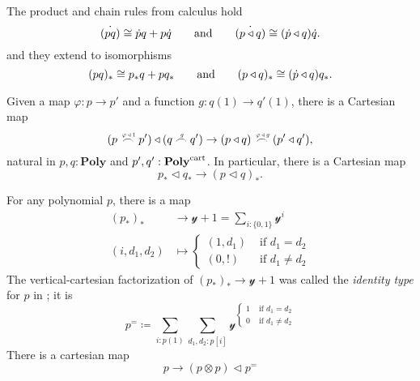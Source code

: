 \documentclass[11pt, one side, article]{memoir}
\theoremstyle{definition}
\theoremstyle{plain}
\newcommand{\Cat}[1]{\mathbf{#1}}%
\newcommand{\tn}[1]{\textnormal{#1}}
\newcommand{\yon}{{\mathcal{y}}}
\newcommand{\poly}{\Cat{Poly}}
\newcommand{\polycart}{\poly^{\tn{cart}}}
\newcommand{\0}{\textsf{0}}
\newcommand{\1}{\tn{\textsf{1}}}
\newcommand{\tri}{\mathbin{\triangleleft}}
\newcommand{\indexcoclscale}[1]{\scalebox{.7}{#1}}
\newcommand{\cocl}[1]{
	\scriptsize\overset{\,\indexcoclscale{$#1$}}{\frown}\normalsize
}
\newcommand{\hh}[2][]{#1 \tn{#2} #1}
\newcommand{\qqand}{\hh[\qquad]{and}}
\begin{document}
The product and chain rules from calculus hold
\begin{equation}\label{eqn.calculus}
	\dot{(pq)}\cong \dot{p}q+p\dot{q}
	\qqand
	\dot{(p\tri q)}\cong(\dot{p}\tri q)\dot{q}.
\end{equation}
and they extend to isomorphisms 
\begin{equation}\label{eqn.calculus}
	(pq)_*\cong p_*q+pq_*
	\qqand
	(p\tri q)_*\cong(\dot{p}\tri q)q_*.
\end{equation}

Given a map $\varphi\colon p\to p'$ and a function $g\colon q(1)\to q'(1)$, there is a Cartesian map
\begin{equation}
	(p\cocl{\varphi\tri1}p')\tri(q\cocl{g}q')\to
	(p\tri q)\cocl{\varphi\tri g}(p'\tri q'),
\end{equation}
natural in $p,q:\poly$ and $p',q':\polycart$. In particular, there is a Cartesian map
\begin{equation}
	p_*\tri q_*\to(p\tri q)_*.
\end{equation}


For any polynomial $p$, there is a map
\begin{align}
	(p_*)_*&\to\yon+1=\sum_{i:\{0,1\}}\yon^i\\
	(i,d_1,d_2)&\mapsto
	\begin{cases}
		(1,d_1)&\text{ if } d_1=d_2 \\
		(0,!)&\text{ if }d_1\neq d_2
	\end{cases}
\end{align}
The vertical-cartesian factorization of $(p_*)_*\to\yon+1$ was called the \emph{identity type} for $p$ in \cite{aberle2024polynomial}; it is
\begin{equation}
	p^=\coloneqq\sum_{i:p(1)}\sum_{d_1,d_2:p[i]}\yon^{\begin{cases}1&\text{ if } d_1=d_2 \\0&\text{ if }d_1\neq d_2\end{cases}}
\end{equation}
There is a cartesian map
\begin{equation}
	p\to (p\otimes p)\tri p^=
\end{equation}
\end{document}
